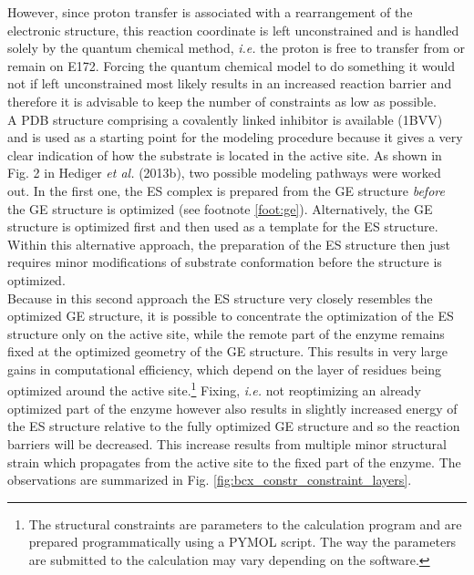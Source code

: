 However, since proton transfer is associated with a rearrangement of the electronic structure, this reaction coordinate is left unconstrained and is handled solely by the quantum chemical method, \textit{i.e.} the proton is free to transfer from or remain on E172.
Forcing the quantum chemical model to do something it would not if left unconstrained most likely results in an increased reaction barrier and therefore it is advisable to keep the number of constraints as low as possible.\\
A PDB structure comprising a covalently linked inhibitor is available (1BVV) and is used as a starting point for the modeling procedure because it gives a very clear indication of how the substrate is located in the active site.
As shown in Fig. 2 in Hediger \textit{et al.} (2013b), two possible modeling pathways were worked out.
In the first one, the ES complex is prepared from the GE structure \textit{before} the GE structure is optimized (see footnote \ref{foot:ge}).
Alternatively, the GE structure is optimized first and then used as a template for the ES structure.
Within this alternative approach, the preparation of the ES structure then just requires minor modifications of substrate conformation before the structure is optimized.\\
Because in this second approach the ES structure very closely resembles the optimized GE structure, it is possible to concentrate the optimization of the ES structure only on the active site, while the remote part of the enzyme remains fixed at the optimized geometry of the GE structure.
This results in very large gains in computational efficiency, which depend on the layer of residues being optimized around the active site.\footnote{The structural constraints are parameters to the calculation program and are prepared programmatically using a PYMOL script. The way the parameters are submitted to the calculation may vary depending on the software.}
Fixing, \textit{i.e.} not reoptimizing an already optimized part of the enzyme however also results in slightly increased energy of the ES structure relative to the fully optimized GE structure and so the reaction barriers will be decreased.
This increase results from multiple minor structural strain which propagates from the active site to the fixed part of the enzyme.
The observations are summarized in Fig. \ref{fig:bcx_constr_constraint_layers}.
